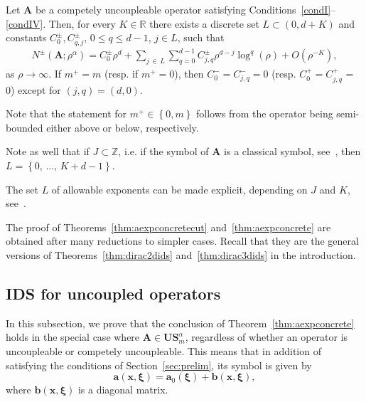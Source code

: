 \documentclass[AHL,Unicode,longabstracts,published]{cedram}
\newcommand{\R}{\mathbb R}
\newcommand{\Z}{\mathbb Z}
\newcommand{\bxi}{\boldsymbol \xi}
\newcommand{\ba}{\mathbf a}
\newcommand{\BA}{\mathbf A}
\newcommand{\BS}{\mathbf S}
\newcommand{\BU}{\mathbf U}
\newcommand{\bx}{\mathbf x}
\newcommand{\bbb}{\mathbf b}
\newcommand{\pd}{uncoupleable}
\newcommand{\mpu}{competely uncoupleable}
\newcommand{\bigo}[1]{O\left(#1 \right)}
\newcommand{\set}[1]{\left\{ #1 \right\}}
\begin{document}
\begin{theo} \label{thm:aexpconcrete}
Let $\BA$ be a \mpu{} operator satisfying Conditions~\ref{condI}--\ref{condIV}. Then, for every $K \in \R$ there exists a discrete set $L \subset (0,d+K)$ and constants $C_0^\pm, C_{q,j}^\pm$, $0 \le q \le d-1$, $j \in L$, such that
\begin{equation}
\begin{aligned}
N^\pm\left(\BA; \rho^\alpha \right) = C_0^\pm \rho^d +
\sum_{j\,\in\,L}\sum_{q =0}^{d-1} C_{j,q}^\pm \rho^{d-j} \log^q(\rho) + \bigo{\rho^{-K}},
\end{aligned}\label{eq:asymptoticsconcrete}
\end{equation}
as $\rho \to \infty$. If $m^+ = m$ (resp. if $m^+ = 0$), then $C_0^- = C^-_{j,q} = 0$ (resp. $C_0^+ = C^+_{j,q}$ = 0) except for $(j,q) = (d,0)$.
\end{theo}

\begin{rema}
Note that the statement for $m^+ \in \set{0,m}$ follows from the operator being semi-bounded either above or below, respectively.

Note as well that if $J \subset \Z$, i.e. if the symbol of $\BA$ is a classical symbol, see~\cite[Chapter~7]{TaylorII}, then $L=
\set{0,\,\dotsc,\,K + d - 1}$.

The set $L$ of allowable exponents can be made explicit, depending on $J$ and $K$, see~\cite[Remark~2.7]{MorParSht2014}.
\end{rema}

The proof of Theorems~\ref{thm:aexpconcretecut} and~\ref{thm:aexpconcrete} are obtained after many reductions to simpler cases. Recall that they are the general versions of Theorems~\ref{thm:dirac2dids} and~\ref{thm:dirac3dids} in the introduction.

\subsection{IDS for uncoupled operators} \label{sec:uncoupled}

In this subsection, we prove that the conclusion of Theorem~\ref{thm:aexpconcrete} holds in the special case where $\BA \in \BU\BS_m^\alpha$, regardless of whether an operator is \pd{} or \mpu{}. This means that in addition of satisfying the conditions of Section~\ref{sec:prelim}, its symbol is given by
\begin{equation}\label{eq:modeldmapo}
\ba(\bx,\bxi) = \ba_0(\bxi) + \bbb(\bx,\bxi),
\end{equation}
where $\bbb(\bx,\bxi)$ is a diagonal matrix.
\end{document}
